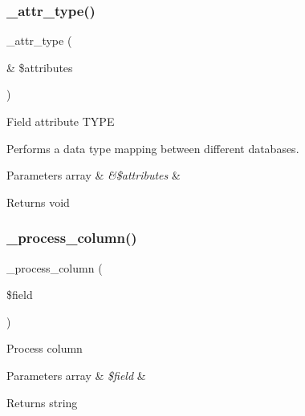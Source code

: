 \subsubsection{\texorpdfstring{\+\_\+attr\+\_\+type()}{\_attr\_type()}}
{\footnotesize\ttfamily \+\_\+attr\+\_\+type (\begin{DoxyParamCaption}\item[{\&}]{\$attributes }\end{DoxyParamCaption})\hspace{0.3cm}{\ttfamily [protected]}}

Field attribute T\+Y\+PE

Performs a data type mapping between different databases.


\begin{DoxyParams}[1]{Parameters}
array & {\em \&\$attributes} & \\
\hline
\end{DoxyParams}
\begin{DoxyReturn}{Returns}
void 
\end{DoxyReturn}
\mbox{\label{class_c_i___d_b__ibase__forge_a8f38f1c5b5dddecca4befbe393f3f299}} 
\subsubsection{\texorpdfstring{\+\_\+process\+\_\+column()}{\_process\_column()}}
{\footnotesize\ttfamily \+\_\+process\+\_\+column (\begin{DoxyParamCaption}\item[{}]{\$field }\end{DoxyParamCaption})\hspace{0.3cm}{\ttfamily [protected]}}

Process column


\begin{DoxyParams}[1]{Parameters}
array & {\em \$field} & \\
\hline
\end{DoxyParams}
\begin{DoxyReturn}{Returns}
string 
\end{DoxyReturn}
\mbox{\label{class_c_i___d_b__ibase__forge_a902a7267babceb2ce595706f217e00ad}} 
